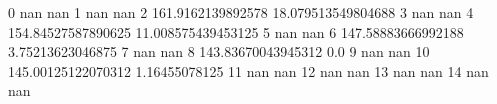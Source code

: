 0 nan nan
1 nan nan
2 161.9162139892578 18.079513549804688
3 nan nan
4 154.84527587890625 11.008575439453125
5 nan nan
6 147.58883666992188 3.75213623046875
7 nan nan
8 143.83670043945312 0.0
9 nan nan
10 145.00125122070312 1.16455078125
11 nan nan
12 nan nan
13 nan nan
14 nan nan
